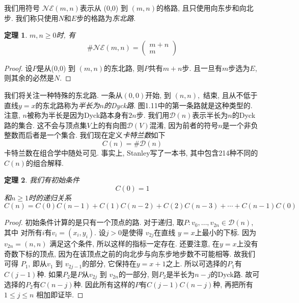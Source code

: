 \documentclass{ctexbook}
\newtheorem{thm}{定理}[section]
\begin{document}
我们用符号 $\mathcal{N} \mathcal{E}(m, n)$表示从 (0,0) 到 $(m, n)$的格路, 且只使用向东步和向北步. 我们称只使用$N$和$E$步的格路为\textsl{东北路}.
       \begin{thm}
      	$m, n \geqslant 0$时, 有
      	$$
      	\# \mathcal{N} \mathcal{E}(m, n)=\left(\begin{array}{c}
      	m+n \\
      	m
      	\end{array}\right)
      	$$
      \end{thm}
      \begin{proof}
      	设$P$是从(0,0) 到 $(m, n)$的东北路, 则$P$共有$m+n$步. 且一旦有$m$步选为$E$, 则其余的必然是$N$.
      \end{proof}
我们将关注一种特殊的东北路. 一条从$(0,0)$开始,  到 $(n, n),$ 结束, 且从不低于直线$y=x$的东北路称为\textsl{半长为$n$的Dyck路}.
图1.11中的第一条路就是这种类型的. 注意, $n$被称为半长是因为Dyck路本身有$2n$步. 我们用$\mathcal{D}(n)$表示半长为$n$的Dyck路的集合.
这不会与顶点集$V$上的有向图$\mathcal{D}(V)$混淆, 因为前者的符号$n$是一个非负整数而后者是一个集合. 我们现在定义\textsl{卡特兰数}如下
$$
C(n)=\# \mathcal{D}(n)
$$
卡特兰数在组合学中随处可见. 事实上, Stanley写了一本书, 其中包含214种不同的$C(n) $的组合解释.
       \begin{thm}
      	我们有初始条件
      	$$
      	C(0)=1
      	$$
      	和$n \geqslant 1$时的递归关系
      	$$
      	C(n)=C(0) C(n-1)+C(1) C(n-2)+C(2) C(n-3)+\cdots+C(n-1) C(0)
      	$$
      \end{thm}
      \begin{proof}
      	初始条件计算的是只有一个顶点的路. 对于递归, 取$P: v_{0}, \ldots, v_{2 n} \in \mathcal{D}(n)$, 其中
      	对所有$i$有$v_{i}=\left(x_{i}, y_{i}\right)$. 设$j>0$是使得 $v_{2 j}$在直线 $y=x$上最小的下标. 因为$v_{2 n}=(n, n)$
      	满足这个条件, 所以这样的指标一定存在. 还要注意, 在$y=x$上没有奇数下标的顶点, 因为在该顶点之前的向北步与向东步地步数不可能相等.
      	故我们可得 $P_{1}$, 即从$v_{1}$ 到 $v_{2 j-1}$的部分, 它保持在$y=x+1$之上. 所以可选择的$P_{1}$有$C(j-1)$种.
      	如果$P_{2}$是$P$从$v_{2 j}$ 到 $v_{2 n}$的一部分, 则$P_{2}$是半长为$n-j$的Dyck路. 故可选择的$P_{2}$有$C(n-j)$种.
      	因此所有这样的$P$有$C(j-1) C(n-j)$种, 再把所有$1 \leqslant j \leqslant n$ 相加即证毕.
      \end{proof}
\end{document}
